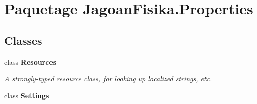 \hypertarget{namespace_jagoan_fisika_1_1_properties}{\section{Paquetage Jagoan\+Fisika.\+Properties}
\label{namespace_jagoan_fisika_1_1_properties}
}
\subsection*{Classes}
\begin{DoxyCompactItemize}
\item 
class {\bfseries Resources}
\begin{DoxyCompactList}\small\item\em A strongly-\/typed resource class, for looking up localized strings, etc. \end{DoxyCompactList}\item 
class {\bfseries Settings}
\end{DoxyCompactItemize}
